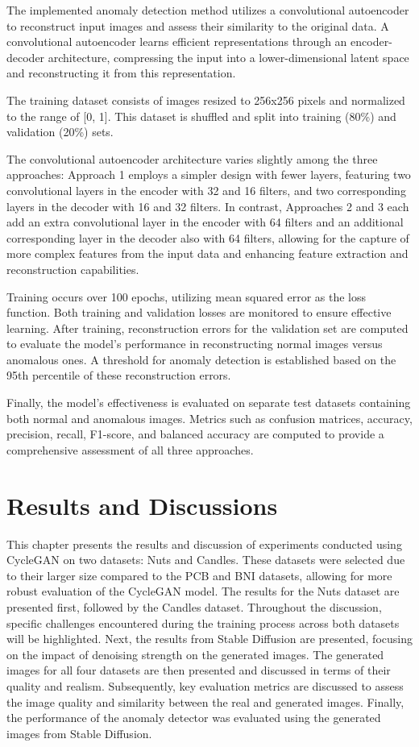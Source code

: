 \documentclass[12pt,DIV14,BCOR12mm,a4paper,footinclude=false,headinclude,parskip=half-,twoside,openright,cleardoublepage=empty,toc=index,bibliography=totoc,listof=totoc]{scrreprt}
\numberwithin{equation}{chapter}
\begin{document}
The implemented anomaly detection method utilizes a convolutional autoencoder to reconstruct input images and assess their similarity to the original data. A convolutional autoencoder learns efficient representations through an encoder-decoder architecture, compressing the input into a lower-dimensional latent space and reconstructing it from this representation.

The training dataset consists of images resized to 256x256 pixels and normalized to the range of [0, 1]. This dataset is shuffled and split into training (80\%) and validation (20\%) sets.

The convolutional autoencoder architecture varies slightly among the three approaches: Approach 1 employs a simpler design with fewer layers, featuring two convolutional layers in the encoder with 32 and 16 filters, and two corresponding layers in the decoder with 16 and 32 filters. In contrast, Approaches 2 and 3 each add an extra convolutional layer in the encoder with 64 filters and an additional corresponding layer in the decoder also with 64 filters, allowing for the capture of more complex features from the input data and enhancing feature extraction and reconstruction capabilities.

Training occurs over 100 epochs, utilizing mean squared error as the loss function. Both training and validation losses are monitored to ensure effective learning. After training, reconstruction errors for the validation set are computed to evaluate the model's performance in reconstructing normal images versus anomalous ones. A threshold for anomaly detection is established based on the 95th percentile of these reconstruction errors.

Finally, the model's effectiveness is evaluated on separate test datasets containing both normal and anomalous images. Metrics such as confusion matrices, accuracy, precision, recall, F1-score, and balanced accuracy are computed to provide a comprehensive assessment of all three approaches.

\chapter{Results and Discussions}
\label{chapter4}
This chapter presents the results and discussion of experiments conducted using CycleGAN on two datasets: Nuts and Candles. These datasets were selected due to their larger size compared to the PCB and BNI datasets, allowing for more robust evaluation of the CycleGAN model. The results for the Nuts dataset are presented first, followed by the Candles dataset. Throughout the discussion, specific challenges encountered during the training process across both datasets will be highlighted. Next, the results from Stable Diffusion are presented, focusing on the impact of denoising strength on the generated images. The generated images for all four datasets are then presented and discussed in terms of their quality and realism. Subsequently, key evaluation metrics are discussed to assess the image quality and similarity between the real and generated images. Finally, the performance of the anomaly detector was evaluated using the generated images from Stable Diffusion.
\end{document}
